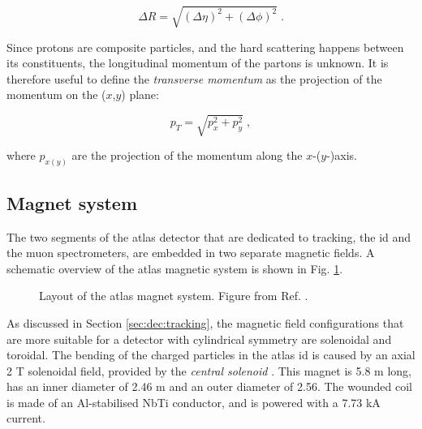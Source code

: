 \begin{equation}
\label{eq:cern:dR}
\Delta R = \sqrt{ (\Delta \eta)^2 + (\Delta \phi)^2  } \; .
\end{equation}

Since protons are composite particles, and the hard scattering happens between its constituents, the longitudinal momentum of the partons is unknown. It is therefore useful to define the \textit{transverse momentum} as the projection of the momentum on the ($x$,$y$) plane: 

\begin{equation}
\label{eq:cern:pt}
p_T = \sqrt{p_x^2 + p_y^2} \; ,
\end{equation}

\noindent where $p_{x(y)}$ are the projection of the momentum along the $x$-($y$-)axis.



\subsection{Magnet system}
\label{sec:atlas:magnets}

The two segments of the \gls{atlas} detector that are dedicated to tracking, the \gls{id} and the muon spectrometers, are embedded in two separate magnetic fields. A schematic overview of the \gls{atlas} magnetic system is shown in Fig. \ref{fig:atlas:magnet}.
\label{sec:cern:atlasmagnets}
\begin{figure}[ht]
\centering
{}
\caption{Layout of the \gls{atlas} magnet system. Figure from Ref. \cite{Goodson}.}
\label{fig:atlas:magnet}
\end{figure}

As discussed in Section \ref{sec:dec:tracking}, the magnetic field configurations that are more suitable for a detector with cylindrical symmetry are solenoidal and toroidal. The bending of the charged particles in the \gls{atlas} \gls{id} is caused by an axial 2 T solenoidal field, provided by the \textit{central solenoid} \cite{YAMAMOTO200853}. This magnet is 5.8 m long, has an inner diameter of 2.46 m and an outer diameter of 2.56. The wounded coil is made of an Al-stabilised NbTi conductor, and is powered with a 7.73 kA current. 


